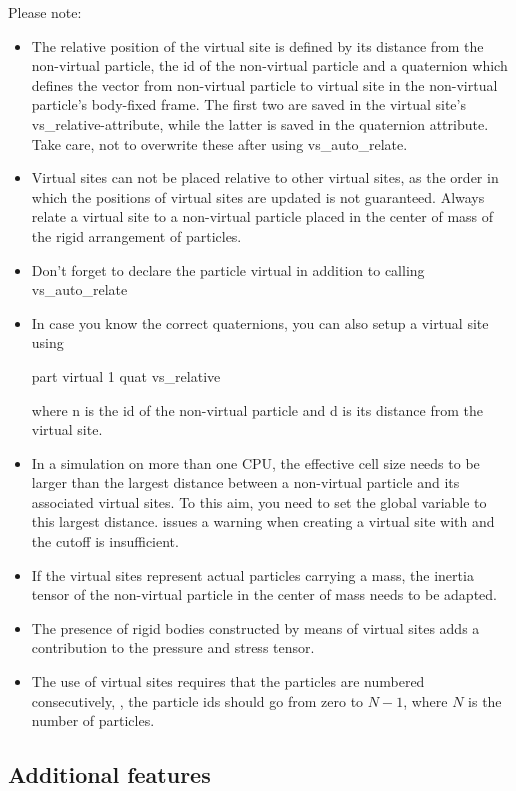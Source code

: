 Please note:
\begin{itemize}
\item The relative position of the virtual site is defined by its
  distance from the non-virtual particle, the id of the non-virtual
  particle and a quaternion which defines the vector from non-virtual
  particle to virtual site in the non-virtual particle's body-fixed
  frame. The first two are saved in the virtual site's
  vs\_relative-attribute, while the latter is saved in the quaternion
  attribute. Take care, not to overwrite these after using
  vs\_auto\_relate.
\item Virtual sites can not be placed relative to other virtual sites,
  as the order in which the positions of virtual sites are updated is
  not guaranteed. Always relate a virtual site to a non-virtual
  particle placed in the center of mass of the rigid arrangement of
  particles.
\item Don't forget to declare the particle virtual in addition to
  calling vs\_auto\_relate
\item In case you know the correct quaternions, you can also setup a
  virtual site using
  \begin{essyntaxbox}
    part  virtual 1 quat  vs_relative  
  \end{essyntaxbox}
  where n is the id of the non-virtual particle and d is its distance
  from the virtual site.
\item In a simulation on more than one CPU, the effective cell size
  needs to be larger than the largest distance between a non-virtual
  particle and its associated virtual sites. To this aim, you need to
  set the global variable  to this largest
  distance. \es issues a warning when creating a virtual site with
   and the cutoff is insufficient.
\item If the virtual sites represent actual particles carrying a mass,
  the inertia tensor of the non-virtual particle in the center of mass
  needs to be adapted.
\item The presence of rigid bodies constructed by means of virtual
  sites adds a contribution to the pressure and stress tensor.
\item The use of virtual sites requires that the particles are
  numbered consecutively, \ie, the particle ids should go from zero to
  $N-1$, where $N$ is the number of particles.
\end{itemize}

\subsection{Additional features}


